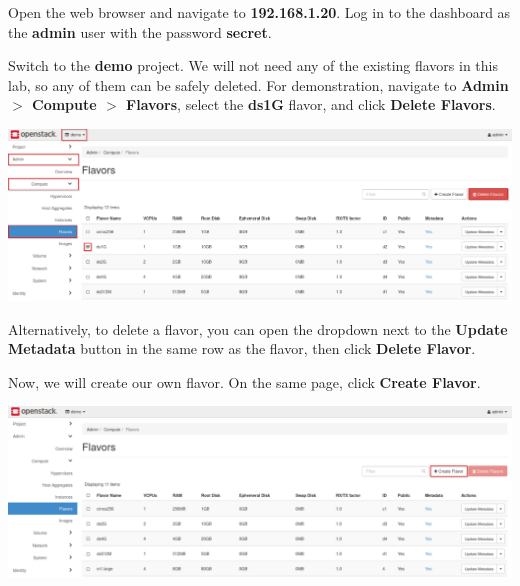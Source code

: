 \documentclass[letterpaper, 12pt]{article}
\begin{document}
\begin{enumerate}
    \begin{labstep}
        Open the web browser and navigate to \textbf{192.168.1.20}.
        Log in to the dashboard as the \textbf{admin} user with the password \textbf{secret}.
    \end{labstep}

    \begin{labstep}
        Switch to the \textbf{demo} project.
        We will not need any of the existing flavors in this lab, so any of them can be safely deleted.
        For demonstration, navigate to \textbf{Admin $>$ Compute $>$ Flavors}, select the \textbf{ds1G} flavor, and click \textbf{Delete Flavors}.

        \begin{center}
            \includegraphics[width=\linewidth]{images/part2/step2.png}
        \end{center}
    \end{labstep}

    \begin{tipbox}
        Alternatively, to delete a flavor, you can open the dropdown next to the \textbf{Update Metadata} button in the same row as the flavor, then click \textbf{Delete Flavor}.
    \end{tipbox}

    \begin{labstep}
        Now, we will create our own flavor.
        On the same page, click \textbf{Create Flavor}.

        \begin{center}
            \includegraphics[width=\linewidth]{images/part2/step3.png}
        \end{center}
    \end{labstep}


\end{enumerate}
\end{document}
